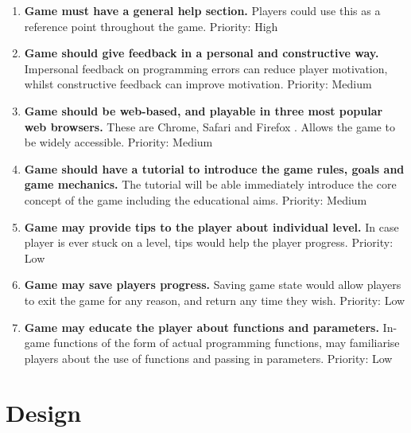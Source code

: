\documentclass[a4paper,11.5pt]{report}
\numberwithin{figure}{section}
\numberwithin{table}{section}
\numberwithin{equation}{section}
\numberwithin{equation}{section}
\newcommand\blankpage{%
    \null
    \thispagestyle{empty}%
    \addtocounter{page}{-1}%
    \newpage}
\begin{document}
\begin{enumerate}[label=3.2.\arabic*]
  \item \textbf{Game must have a general help section.} Players could use this as a reference point throughout the game. \newline Priority: High
  
  \item \textbf{Game should give feedback in a personal and constructive way.} Impersonal feedback on programming errors can reduce player motivation, whilst constructive feedback can improve motivation. \newline Priority: Medium

  \item \textbf{Game should be web-based, and playable in three most popular web browsers.} These are Chrome, Safari and Firefox \citep{statistabrowser}. Allows the game to be widely accessible.  \newline Priority: Medium
  
  \item \textbf{Game should have a tutorial to introduce the game rules, goals and game mechanics.} The tutorial will be able immediately introduce the core concept of the game including the educational aims. \newline Priority: Medium
  
  \item \textbf{Game may provide tips to the player about individual level.}  In case player is ever stuck on a level, tips would help the player progress. \newline Priority: Low 
  
  \item \textbf{Game may save players progress.} Saving game state would allow players to exit the game for any reason, and return any time they wish. \newline Priority: Low
  
  \item \textbf{Game may educate the player about functions and parameters.}  In-game functions of the form of actual programming functions, may familiarise players about the use of functions and passing in parameters. \newline Priority: Low
  
\end{enumerate}


\afterpage{\blankpage}






\chapter{Design}
\end{document}
